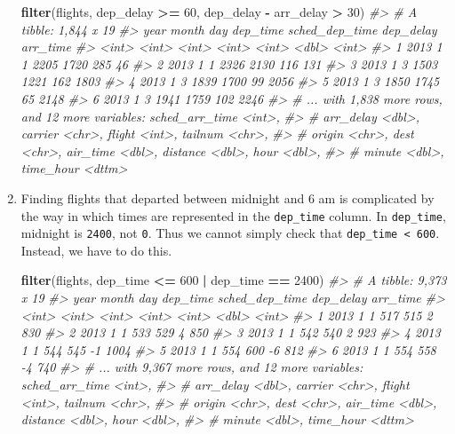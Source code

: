 \documentclass[]{book}
\newenvironment{Shaded}{\begin{snugshade}}{\end{snugshade}}
\newcommand{\CommentTok}[1]{\textcolor[rgb]{0.56,0.35,0.01}{\textit{#1}}}
\newcommand{\DecValTok}[1]{\textcolor[rgb]{0.00,0.00,0.81}{#1}}
\newcommand{\KeywordTok}[1]{\textcolor[rgb]{0.13,0.29,0.53}{\textbf{#1}}}
\newcommand{\NormalTok}[1]{#1}
\newcommand{\OperatorTok}[1]{\textcolor[rgb]{0.81,0.36,0.00}{\textbf{#1}}}
\newcommand{\StringTok}[1]{\textcolor[rgb]{0.31,0.60,0.02}{#1}}
\theoremstyle{plain}
\theoremstyle{remark}
\theoremstyle{definition}
\theoremstyle{definition}
\theoremstyle{definition}
\theoremstyle{remark}
\begin{document}
\begin{enumerate}
\begin{Shaded}
\begin{Highlighting}[]
\KeywordTok{filter}\NormalTok{(flights, dep_delay }\OperatorTok{>=}\StringTok{ }\DecValTok{60}\NormalTok{, dep_delay }\OperatorTok{-}\StringTok{ }\NormalTok{arr_delay }\OperatorTok{>}\StringTok{ }\DecValTok{30}\NormalTok{)}
\CommentTok{#> # A tibble: 1,844 x 19}
\CommentTok{#>    year month   day dep_time sched_dep_time dep_delay arr_time}
\CommentTok{#>   <int> <int> <int>    <int>          <int>     <dbl>    <int>}
\CommentTok{#> 1  2013     1     1     2205           1720       285       46}
\CommentTok{#> 2  2013     1     1     2326           2130       116      131}
\CommentTok{#> 3  2013     1     3     1503           1221       162     1803}
\CommentTok{#> 4  2013     1     3     1839           1700        99     2056}
\CommentTok{#> 5  2013     1     3     1850           1745        65     2148}
\CommentTok{#> 6  2013     1     3     1941           1759       102     2246}
\CommentTok{#> # ... with 1,838 more rows, and 12 more variables: sched_arr_time <int>,}
\CommentTok{#> #   arr_delay <dbl>, carrier <chr>, flight <int>, tailnum <chr>,}
\CommentTok{#> #   origin <chr>, dest <chr>, air_time <dbl>, distance <dbl>, hour <dbl>,}
\CommentTok{#> #   minute <dbl>, time_hour <dttm>}
\end{Highlighting}
\end{Shaded}
\item
  Finding flights that departed between midnight and 6 am is complicated
  by the way in which times are represented in the \texttt{dep\_time}
  column. In \texttt{dep\_time}, midnight is \texttt{2400}, not
  \texttt{0}. Thus we cannot simply check that
  \texttt{dep\_time\ \textless{}\ 600}. Instead, we have to do this.

\begin{Shaded}
\begin{Highlighting}[]
\KeywordTok{filter}\NormalTok{(flights, dep_time }\OperatorTok{<=}\StringTok{ }\DecValTok{600} \OperatorTok{|}\StringTok{ }\NormalTok{dep_time }\OperatorTok{==}\StringTok{ }\DecValTok{2400}\NormalTok{)}
\CommentTok{#> # A tibble: 9,373 x 19}
\CommentTok{#>    year month   day dep_time sched_dep_time dep_delay arr_time}
\CommentTok{#>   <int> <int> <int>    <int>          <int>     <dbl>    <int>}
\CommentTok{#> 1  2013     1     1      517            515         2      830}
\CommentTok{#> 2  2013     1     1      533            529         4      850}
\CommentTok{#> 3  2013     1     1      542            540         2      923}
\CommentTok{#> 4  2013     1     1      544            545        -1     1004}
\CommentTok{#> 5  2013     1     1      554            600        -6      812}
\CommentTok{#> 6  2013     1     1      554            558        -4      740}
\CommentTok{#> # ... with 9,367 more rows, and 12 more variables: sched_arr_time <int>,}
\CommentTok{#> #   arr_delay <dbl>, carrier <chr>, flight <int>, tailnum <chr>,}
\CommentTok{#> #   origin <chr>, dest <chr>, air_time <dbl>, distance <dbl>, hour <dbl>,}
\CommentTok{#> #   minute <dbl>, time_hour <dttm>}
\end{Highlighting}
\end{Shaded}


\end{enumerate}
\end{document}
